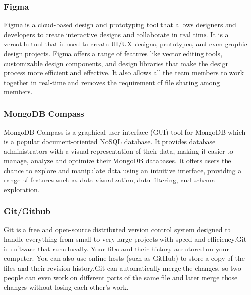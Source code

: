 \subsubsection{Figma}
Figma is a cloud-based design and prototyping tool that allows designers and
developers to create interactive designs and collaborate in real time.\cite{UI&UX} It is a versatile tool that is used to create UI/UX designs, prototypes, and even graphic design projects. Figma offers a range of features like vector editing tools, customizable design components, and design libraries that make the design process more efficient and effective. It also allows all the team members to work together in real-time and removes the requirement of file sharing among members.

\subsubsection{MongoDB Compass}
MongoDB Compass is a graphical user interface (GUI) tool for MongoDB which is a popular document-oriented NoSQL database. It provides database administrators with a visual representation of their data, making it easier to manage, analyze and optimize their MongoDB databases. It offers users the chance to explore and manipulate data using an intuitive interface, providing a range of features such as data visualization, data filtering, and schema exploration.

\subsubsection{Git/Github}
\cite{Git/Github}Git is a free and open-source distributed version control system designed to handle everything from small to very large projects with speed and efficiency.Git is software that runs locally. Your files and their history are stored on your computer. You can also use online hosts (such as GitHub) to store a copy of the files and their revision history.Git can automatically merge the changes, so two people can even work on different parts of the same file and later merge those changes without losing each other’s work.

